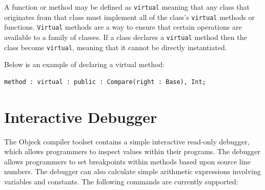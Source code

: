 \documentclass[12pt]{article}
\begin{document}
A function or method may be defined as \texttt{virtual} meaning that any class that originates from that class must implement all of the class's \texttt{virtual} methods or functions.  \texttt{Virtual} methods are a way to ensure that certain operations are available to a family of classes. If a class declares a \texttt{virtual} method then the class become \texttt{virtual}, meaning that it cannot be directly instantiated.

Below is an example of declaring a virtual method:
\begin{verbatim}
method : virtual : public : Compare(right : Base), Int;
\end{verbatim}

\section{Interactive Debugger}
The Objeck compiler toolset contains a simple interactive read-only debugger, which allows programmers to inspect values within their programs.  The debugger allows programmers to set breakpoints within methods based upon source line numbers.  The debugger can also calculate simple arithmetic expressions involving variables and constants. The following commands are currently supported:
\end{document}
